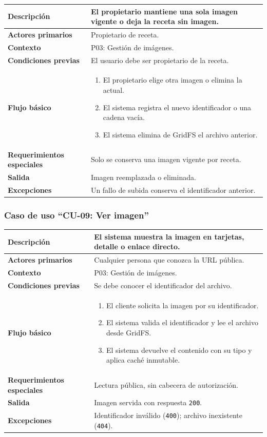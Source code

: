 \documentclass[doc,12pt,a4paper]{apa7}
\begin{document}
\begin{longtable}{|P{3.3cm}|L{11.2cm}|}
\hline
\textbf{Descripción} & El propietario mantiene una sola imagen vigente o deja la receta sin imagen. \\ \hline
\textbf{Actores primarios} & Propietario de receta. \\ \hline
\textbf{Contexto} & P03: Gestión de imágenes. \\ \hline
\textbf{Condiciones previas} & El usuario debe ser propietario de la receta. \\ \hline
\textbf{Flujo básico} &
\begin{enumerate}
    \item El propietario elige otra imagen o elimina la actual.
    \item El sistema registra el nuevo identificador o una cadena vacía.
    \item El sistema elimina de GridFS el archivo anterior.
\end{enumerate} \\ \hline
\textbf{Requerimientos especiales} & Solo se conserva una imagen vigente por receta. \\ \hline
\textbf{Salida} & Imagen reemplazada o eliminada. \\ \hline
\textbf{Excepciones} & Un fallo de subida conserva el identificador anterior. \\ \hline
\end{longtable}

\subsubsection{Caso de uso ``CU-09: Ver imagen''}

\begin{longtable}{|P{3.3cm}|L{11.2cm}|}
\hline
\textbf{Descripción} & El sistema muestra la imagen en tarjetas, detalle o enlace directo. \\ \hline
\textbf{Actores primarios} & Cualquier persona que conozca la URL pública. \\ \hline
\textbf{Contexto} & P03: Gestión de imágenes. \\ \hline
\textbf{Condiciones previas} & Se debe conocer el identificador del archivo. \\ \hline
\textbf{Flujo básico} &
\begin{enumerate}
    \item El cliente solicita la imagen por su identificador.
    \item El sistema valida el identificador y lee el archivo desde GridFS.
    \item El sistema devuelve el contenido con su tipo y aplica caché inmutable.
\end{enumerate} \\ \hline
\textbf{Requerimientos especiales} & Lectura pública, sin cabecera de autorización. \\ \hline
\textbf{Salida} & Imagen servida con respuesta \texttt{200}. \\ \hline
\textbf{Excepciones} & Identificador inválido (\texttt{400}); archivo inexistente (\texttt{404}). \\ \hline
\end{longtable}
\end{document}
